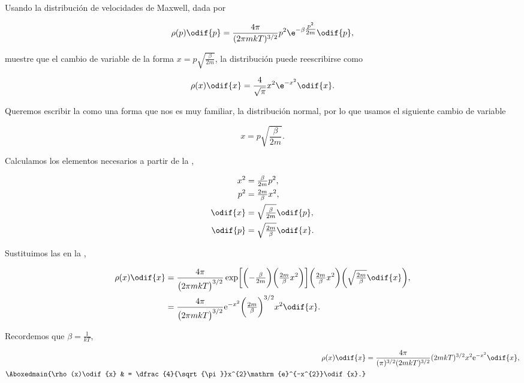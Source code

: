 \documentclass[../main.tex]{subfiles}
\begin{document}
\begin{problema}[10]
	Usando la distribución de velocidades de Maxwell, dada por

	\begin{equation}
		\rho(p)\odif{p} = \dfrac{4\pi}{(2\pi m k T)^{3/2}}p^{2}\e^{-\beta \tfrac{p^{2}}{2m}}\odif{p},
		\label{eq:vDist}
	\end{equation}

	muestre que el cambio de variable de la forma
	\(x = p\sqrt{\tfrac{\beta}{2m}}\), la distribución puede
	reescribirse como

	\begin{equation*}
		\rho(x)\odif{x} = \dfrac{4}{\sqrt{\pi}}x^{2}\e^{-x^{2}}\odif{x}.
	\end{equation*}

	\startsolution

	Queremos escribir la  como una forma que
	nos es muy familiar, la distribución normal, por lo que usamos el
	siguiente cambio de variable

	\begin{equation}
		x = p\sqrt{\dfrac{\beta}{2m}}.
		\label{eq:varChange}
	\end{equation}

	Calculamos los elementos necesarios a partir de la ,

	\begin{align}
		x^{2}    & = \tfrac{\beta}{2m}p^{2},\label{eq:xSquared}       \\
		p^{2}    & = \tfrac{2m}{\beta}x^{2},\label{eq:pSquared}       \\
		\odif{x} & = \sqrt{\tfrac{\beta}{2m}}\odif{p},\label{eq:difx} \\
		\odif{p} & = \sqrt{\tfrac{2m}{\beta}}\odif{x}.\label{eq:difp}
	\end{align}

	Sustituimos las  en
	la ,

	\begin{align*}
		\rho(x)\odif{x} & = \dfrac{4\pi}{\bigl(2\pi m kT\bigr)^{3/2}}
		\exp\biggl[\biggl(-\tfrac{\beta}{2m}\biggr)\biggl(\tfrac{2m}{\beta}x^{2}\biggr)\biggr] \biggl(\tfrac{2m}{\beta}x^{2}\biggr)\biggl(\sqrt{\tfrac{2m}{\beta}}\odif{x}\biggr), \\
		                & = \dfrac{4\pi}{\bigl(2\pi m kT\bigr)^{3/2}}\mathrm{e}^{-x^{2}}\biggl(\tfrac{2m}{\beta}\biggr)^{3/2}x^{2}\odif{x}.
	\end{align*}

	Recordemos que \(\beta = \tfrac{1}{kT}\),

	\begin{align}
		\rho(x)\odif{x}             & = \dfrac{4\pi}{(\pi)^{3/2}(2mkT)^{3/2}}(2mkT)^{3/2}x^{2}\mathrm{e}^{-x^{2}}\odif{x},\nonumber \\
		\Aboxedmain{\rho(x)\odif{x} & = \dfrac{4}{\sqrt{\pi}}x^{2}\mathrm{e}^{-x^{2}}\odif{x}.}\label{eq:vDistInX}
	\end{align}
\end{problema}
\end{document}
